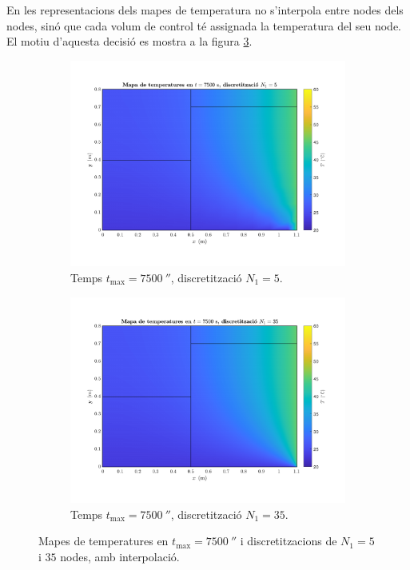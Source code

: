 En les representacions dels mapes de temperatura no s'interpola entre nodes dels nodes, sinó que cada volum de control té assignada la temperatura del seu node. El motiu d'aquesta decisió es mostra a la figura \ref{fig:malla_comparacio}.
\begin{figure}[ht]
	\centering
	\begin{subfigure}{.5\textwidth}
		\centering
		\includegraphics[width=.95\linewidth]{imagenes/04_analisi_influencia_dades_numeriques/malla/malla_31.pdf}
		\vspace{-15pt}
		\caption{Temps $t_\text{max} = 7500 \ \second$, discretització $N_1 = 5$.}
		\label{fig:malla_31}
	\end{subfigure}%
	\begin{subfigure}{.5\textwidth}
		\centering
		\includegraphics[width=.95\linewidth]{imagenes/04_analisi_influencia_dades_numeriques/malla/malla_34.pdf}
		\vspace{-15pt}
		\caption{Temps $t_\text{max} = 7500 \ \second$, discretització $N_1 = 35$.}
		\label{fig:malla_34}
	\end{subfigure}
	\caption{Mapes de temperatures en $t_\text{max} = 7500 \ \second$ i discretitzacions de $N_1 = 5$ i $35$ nodes, amb interpolació.}
	\label{fig:malla_comparacio}
\end{figure} 

